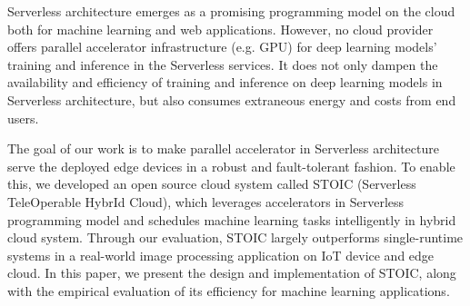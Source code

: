 Serverless architecture emerges as a promising programming model on the cloud both for machine learning and web applications. However, no cloud provider offers parallel accelerator infrastructure (e.g. GPU) for deep learning models' training and inference in the Serverless services. It does not only dampen the availability and efficiency of training and inference on deep learning models in Serverless architecture, but also consumes extraneous energy and costs from end users. 

The goal of our work is to make parallel accelerator in Serverless architecture serve the deployed edge devices in a robust and fault-tolerant fashion. To enable this, we developed an open source cloud system called STOIC (Serverless TeleOperable HybrId Cloud), which leverages accelerators in Serverless programming model and schedules machine learning tasks intelligently in hybrid cloud system. Through our evaluation, STOIC largely outperforms single-runtime systems in a real-world image processing application on IoT device and edge cloud. In this paper, we present the design and implementation of STOIC, along with the empirical evaluation of its efficiency for machine learning applications.
